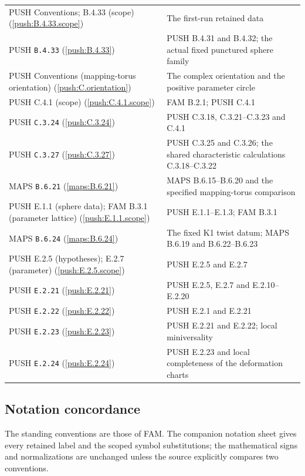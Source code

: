 \documentclass[11pt,a4paper]{article}
\theoremstyle{plain}
\theoremstyle{definition}
\begin{document}
\begin{longtable}{@{}L{.21\linewidth}L{.73\linewidth}@{}}
PUSH Conventions; B.4.33 (scope) (\ref{push:B.4.33.scope}) & The first-run retained data\\
PUSH \nolinkurl{B.4.33} (\ref{push:B.4.33}) & PUSH B.4.31 and B.4.32; the actual fixed punctured sphere family\\
PUSH Conventions (mapping-torus orientation) (\ref{push:C.orientation}) & The complex orientation and the positive parameter circle\\
PUSH C.4.1 (scope) (\ref{push:C.4.1.scope}) & FAM B.2.1; PUSH C.4.1\\
PUSH \nolinkurl{C.3.24} (\ref{push:C.3.24}) & PUSH C.3.18, C.3.21--C.3.23 and C.4.1\\
PUSH \nolinkurl{C.3.27} (\ref{push:C.3.27}) & PUSH C.3.25 and C.3.26; the shared characteristic calculations C.3.18--C.3.22\\
MAPS \nolinkurl{B.6.21} (\ref{maps:B.6.21}) & MAPS B.6.15--B.6.20 and the specified mapping-torus comparison\\
PUSH E.1.1 (sphere data); FAM B.3.1 (parameter lattice) (\ref{push:E.1.1.scope}) & PUSH E.1.1--E.1.3; FAM B.3.1\\
MAPS \nolinkurl{B.6.24} (\ref{maps:B.6.24}) & The fixed K1 twist datum; MAPS B.6.19 and B.6.22--B.6.23\\
PUSH E.2.5 (hypotheses); E.2.7 (parameter) (\ref{push:E.2.5.scope}) & PUSH E.2.5 and E.2.7\\
PUSH \nolinkurl{E.2.21} (\ref{push:E.2.21}) & PUSH E.2.5, E.2.7 and E.2.10--E.2.20\\
PUSH \nolinkurl{E.2.22} (\ref{push:E.2.22}) & PUSH E.2.1 and E.2.21\\
PUSH \nolinkurl{E.2.23} (\ref{push:E.2.23}) & PUSH E.2.21 and E.2.22; local miniversality\\
PUSH \nolinkurl{E.2.24} (\ref{push:E.2.24}) & PUSH E.2.23 and local completeness of the deformation charts\\
\bottomrule\end{longtable}\endgroup
\subsection{Notation concordance}\label{app:notation}
The standing conventions are those of FAM. The companion notation sheet gives every retained label and the scoped symbol substitutions; the mathematical signs and normalizations are unchanged unless the source explicitly compares two conventions.
\end{document}
